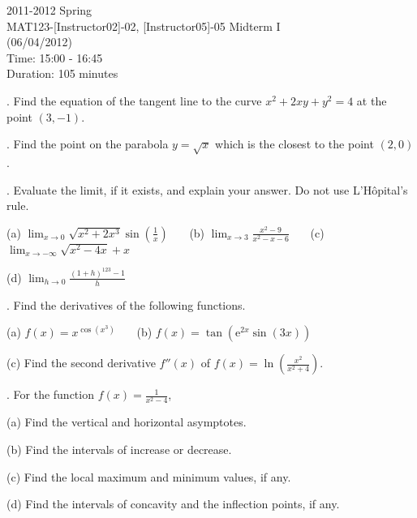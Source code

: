 \documentclass{article}
\begin{document}
\large

\begin{center}
2011-2012 Spring \\MAT123-[Instructor02]-02, [Instructor05]-05 Midterm I\\(06/04/2012)\\Time: 15:00 - 16:45\\Duration: 105 minutes
\end{center}

. Find the equation of the tangent line to the curve $x^2+2xy+y^2=4$ at the point $(3,-1)$.

\hfill

. Find the point on the parabola $y=\sqrt x$ which is the closest to the point $(2,0)$.

\hfill

. Evaluate the limit, if it exists, and explain your answer. Do not use L'Hôpital's rule.

\hfill

(a) $\displaystyle\lim_{x\to0}\sqrt{x^2+2x^3} \sin\left(\frac1x\right)$ \ \ \ (b) $\displaystyle \lim_{x\to3}\frac{x^2-9}{x^2-x-6}$ \ \ \ (c) $\displaystyle \lim_{x\to-\infty}\sqrt{x^2-4x}+x$

\hfill

(d) $\displaystyle\lim_{h\to0}\frac{(1+h)^{123}-1}{h}$

\hfill

. Find the derivatives of the following functions.

\hfill

(a) $f(x)=x^{\cos\left(x^3\right)}$ \ \ \ (b) $f(x) = \tan\left(\mathrm{e}^{2x}\sin(3x)\right)$

\hfill

(c) Find the second derivative $f''(x)$ of $\displaystyle f(x) =\ln\left(\frac{x^2}{x^2+4}\right)$.

\hfill

. For the function $\displaystyle f(x)=\frac{1}{x^2-4}$,

\hfill

(a) Find the vertical and horizontal asymptotes.

\hfill

(b) Find the intervals of increase or decrease.

\hfill

(c) Find the local maximum and minimum values, if any.

\hfill

(d) Find the intervals of concavity and the inflection points, if any.
\end{document}
